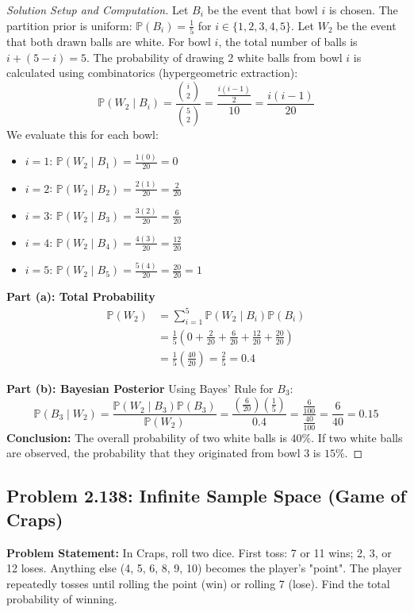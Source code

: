 \documentclass[12pt]{article}
\begin{document}
\begin{proof}[Solution Setup and Computation]
Let $B_i$ be the event that bowl $i$ is chosen. The partition prior is uniform: $\mathbb{P}(B_i) = \frac{1}{5}$ for $i \in \{1,2,3,4,5\}$.
Let $W_2$ be the event that both drawn balls are white.
For bowl $i$, the total number of balls is $i + (5-i) = 5$. The probability of drawing 2 white balls from bowl $i$ is calculated using combinatorics (hypergeometric extraction):
\[ \mathbb{P}(W_2 \mid B_i) = \frac{\binom{i}{2}}{\binom{5}{2}} = \frac{\frac{i(i-1)}{2}}{10} = \frac{i(i-1)}{20} \]
We evaluate this for each bowl:
\begin{itemize}
    \item $i=1$: $\mathbb{P}(W_2 \mid B_1) = \frac{1(0)}{20} = 0$
    \item $i=2$: $\mathbb{P}(W_2 \mid B_2) = \frac{2(1)}{20} = \frac{2}{20}$
    \item $i=3$: $\mathbb{P}(W_2 \mid B_3) = \frac{3(2)}{20} = \frac{6}{20}$
    \item $i=4$: $\mathbb{P}(W_2 \mid B_4) = \frac{4(3)}{20} = \frac{12}{20}$
    \item $i=5$: $\mathbb{P}(W_2 \mid B_5) = \frac{5(4)}{20} = \frac{20}{20} = 1$
\end{itemize}

\textbf{Part (a): Total Probability}
\begin{align*}
    \mathbb{P}(W_2) &= \sum_{i=1}^5 \mathbb{P}(W_2 \mid B_i)\mathbb{P}(B_i) \\
    &= \frac{1}{5} \left( 0 + \frac{2}{20} + \frac{6}{20} + \frac{12}{20} + \frac{20}{20} \right) \\
    &= \frac{1}{5} \left( \frac{40}{20} \right) = \frac{2}{5} = 0.4
\end{align*}

\textbf{Part (b): Bayesian Posterior}
Using Bayes' Rule for $B_3$:
\[ \mathbb{P}(B_3 \mid W_2) = \frac{\mathbb{P}(W_2 \mid B_3)\mathbb{P}(B_3)}{\mathbb{P}(W_2)} = \frac{\left(\frac{6}{20}\right)\left(\frac{1}{5}\right)}{0.4} = \frac{\frac{6}{100}}{\frac{40}{100}} = \frac{6}{40} = 0.15 \]
\textbf{Conclusion:} The overall probability of two white balls is $40\%$. If two white balls are observed, the probability that they originated from bowl 3 is $15\%$.
\end{proof}

\subsection{Problem 2.138: Infinite Sample Space (Game of Craps)}
\textbf{Problem Statement:} In Craps, roll two dice. First toss: 7 or 11 wins; 2, 3, or 12 loses. Anything else (4, 5, 6, 8, 9, 10) becomes the player's "point". The player repeatedly tosses until rolling the point (win) or rolling 7 (lose). Find the total probability of winning.
\end{document}
